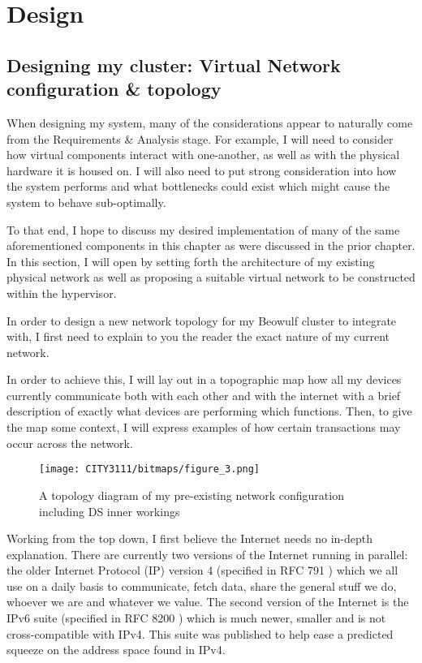 \cleardoublepage
{}
\chapter{Design}
\section{Designing my cluster: Virtual Network configuration \& topology}
When designing my system, many of the considerations appear to naturally come from the Requirements \& Analysis stage. For example, I will need to consider how virtual components interact with one-another, as well as with the physical hardware it is housed on. I will also need to put strong consideration into how the system performs and what bottlenecks could exist which might cause the system to behave sub-optimally.

To that end, I hope to discuss my desired implementation of many of the same aforementioned components in this chapter as were discussed in the prior chapter. In this section, I will open by setting forth the architecture of my existing physical network as well as proposing a suitable virtual network to be constructed within the hypervisor.

\textbf{}

In order to design a new network topology for my Beowulf cluster to integrate with, I first need to explain to you the reader the exact nature of my current network.

In order to achieve this, I will lay out in a topographic map how all my devices currently communicate both with each other and with the internet with a brief description of exactly what devices are performing which functions. Then, to give the map some context, I will express examples of how certain transactions may occur across the network.

\begin{figure}[H]
    \texttt{[image: CITY3111/bitmaps/figure\_3.png]}
    \caption{A topology diagram of my pre-existing network configuration including DS inner workings}
    \label{figure_3}
\end{figure}

Working from the top down, I first believe the Internet needs no in-depth explanation. There are currently two versions of the Internet running in parallel: the older Internet Protocol (IP) version 4 (specified in RFC 791 \cite{ietf_1981}) which we all use on a daily basis to communicate, fetch data, share the general stuff we do, whoever we are and whatever we value. The second version of the Internet is the IPv6 suite (specified in RFC 8200 \cite{ietf_2017}) which is much newer, smaller and is not cross-compatible with IPv4. This suite was published to help ease a predicted squeeze on the address space found in IPv4.

